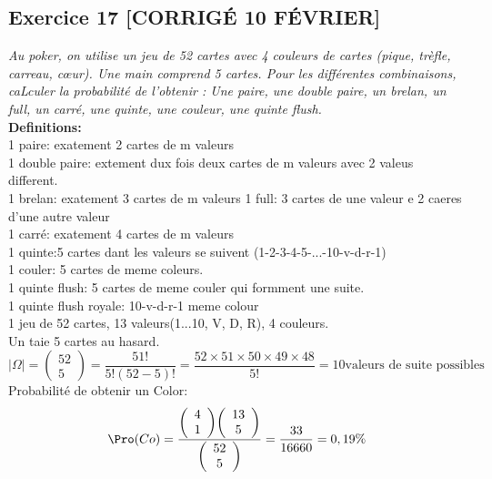 \subsection*{Exercice 17 [CORRIGÉ 10 FÉVRIER]}
\textit{Au poker, on utilise un jeu de 52 cartes avec 4 couleurs de cartes (pique, trèfle, carreau, cœur). Une main comprend 5 cartes. Pour les différentes combinaisons, caLculer la probabilité de l’obtenir :
Une paire, une double paire, un brelan, un full, un carré, une quinte, une couleur, une quinte flush.}\\
\textbf{Definitions:}\\
1 paire: exatement 2 cartes de m valeurs\\
1 double paire: extement dux fois deux cartes de m valeurs avec 2 valeus different.\\
1 brelan: exatement 3 cartes de m valeurs
1 full: 3 cartes de une valeur e 2 caeres d'une autre valeur\\
1 carré:  exatement 4 cartes de m valeurs\\
1 quinte:5 cartes dant les valeurs se suivent (1-2-3-4-5-...-10-v-d-r-1)\\
1 couler: 5 cartes de meme coleurs. \\
1 quinte flush: 5 cartes de meme couler qui formment une suite.\\
1 quinte flush royale: 10-v-d-r-1 meme colour
\\
1 jeu de 52 cartes, 13 valeurs(1...10, V, D, R), 4 couleurs.\\
Un taie 5 cartes au hasard.\\
\begin{equation*}
    | \Omega |  = 
    {\left( \begin{array}{cc}52 \\ 5\end{array} \right)} =
    \frac{51!}{5!(52-5)!} = \frac{52 \times 51 \times 50 \times 49 \times 48}{5!} = 10 \text{valeurs de suite possibles}
\end{equation*}
Probabilité de obtenir un Color:\\
\begin{equation*}
    \Pro(Co) = \frac{{\left( \begin{array}{cc}4 \\ 1\end{array} \right)}{\left( \begin{array}{cc}13 \\ 5\end{array} \right)}}{{\left( \begin{array}{cc}52 \\ 5\end{array} \right)}} = \frac{33}{16660} = 0,19\%
\end{equation*}
